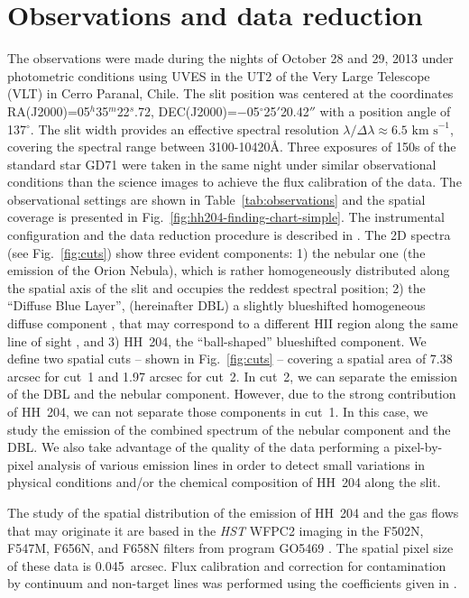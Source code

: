 \documentclass[twocolumn]{aastex63}
\begin{document}
\section{Observations and data reduction}
\label{sec:data}

The observations were made during the nights of October 28 and 29, 2013 under photometric conditions using UVES in the UT2 of the Very Large Telescope (VLT) in Cerro Paranal, Chile. The slit position was centered at the coordinates RA(J2000)=05$^h$35$^m$22$^s$.72, DEC(J2000)=$-$05$^{\circ}$25$'$20.42$''$ with a position angle of 137$^{\circ}$. The slit width provides an effective spectral resolution $\lambda/\Delta \lambda \approx 6.5 \text{ km s}^{-1}$, covering the spectral range between 3100-10420\AA. Three exposures of 150s of the standard star GD71 \citep{Moehler14a, Moehler14b} were taken in the same night under similar observational conditions than the science images to achieve the flux calibration of the data. The observational settings are shown in Table~\ref{tab:observations} and the spatial coverage is presented in Fig.~\ref{fig:hh204-finding-chart-simple}. The instrumental configuration and the data reduction procedure is described in \citet[][hereinafter Paper~I]{mendez2021}. The 2D spectra (see Fig.~\ref{fig:cuts}) show three evident components: 1) the nebular one (the emission of the Orion Nebula), which is rather homogeneously distributed along the spatial axis of the slit and occupies the reddest spectral position; 2) the ``Diffuse Blue Layer'', (hereinafter DBL) a slightly blueshifted homogeneous diffuse component  \citep[previously detected by][]{Deharveng73}, that may correspond to a different H\thinspace II region along the same line of sight \citep{garciadiaz07}, and 3) HH~204, the ``ball-shaped'' blueshifted component. We define two spatial cuts -- shown in Fig.~\ref{fig:cuts} -- covering a spatial area of 7.38 arcsec for cut~1 and 1.97 arcsec for cut~2. In cut~2, we can separate the emission of the DBL and the nebular component. However, due to the strong contribution of HH~204, we can not separate those components in cut~1. In this case, we study the emission of the combined spectrum of the nebular component and the DBL. We also take advantage of the quality of the data performing a pixel-by-pixel analysis of various emission lines in order to detect small variations in physical conditions and/or the chemical composition of HH~204 along the slit.

The study of the spatial distribution of the emission of HH~204 and the gas flows that may originate it are based in the \textit{HST} WFPC2 imaging in the F502N, F547M, F656N, and F658N filters from program GO5469 \citep{ODell:1996a}. The spatial pixel size of these data is \SI{0.045}{arcsec}. Flux calibration and correction for contamination by continuum and non-target lines was performed using the coefficients given in \citet{ODell:2009b}. 
\end{document}

